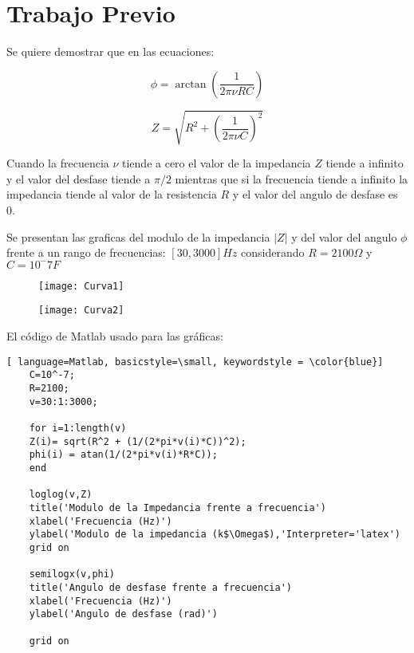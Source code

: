 \documentclass[article, 11pt]{report}
\begin{document}
	\section{Trabajo Previo}
	
	
	 Se quiere demostrar que en las ecuaciones:


$$ \phi = \arctan(\dfrac{1}{2\pi \nu RC })$$ 
	 

$$ Z = \sqrt{R^2 +  (\dfrac{1}{2 \pi \nu C})^2}	$$

Cuando la frecuencia $\nu$ tiende a cero el valor de la impedancia $Z$ tiende a infinito y el valor del desfase tiende a $\pi/2$ mientras que si la frecuencia tiende a infinito la impedancia tiende al valor de la resistencia $R$ y el valor del angulo de desfase es 0.

Se presentan las graficas del modulo de la impedancia $|Z|$ y del valor del angulo $\phi$ frente a un rango de frecuencias: $[30,3000]Hz$ considerando $R=2100\Omega$ y $C= 10^-7 F$	



	


\begin{figure}[H]
	\centering
	\begin{minipage}{.5\textwidth}
		\centering
		\texttt{[image: Curva1]}
	\end{minipage}%
	\begin{minipage}{.5\textwidth}
		\centering
		\texttt{[image: Curva2]}

	\end{minipage}
\end{figure}

El código de Matlab usado para las gráficas:

\lstset{language= Matlab, breaklines=true, basicstyle=\footnotesize}
\begin{lstlisting}[ language=Matlab, basicstyle=\small, keywordstyle = \color{blue}]
	C=10^-7;
	R=2100;
	v=30:1:3000;
	
	for i=1:length(v)
	Z(i)= sqrt(R^2 + (1/(2*pi*v(i)*C))^2);
	phi(i) = atan(1/(2*pi*v(i)*R*C));
	end
	
	loglog(v,Z)
	title('Modulo de la Impedancia frente a frecuencia')
	xlabel('Frecuencia (Hz)')
	ylabel('Modulo de la impedancia (k$\Omega$),'Interpreter='latex')
	grid on
	
	semilogx(v,phi)
	title('Angulo de desfase frente a frecuencia')
	xlabel('Frecuencia (Hz)')
	ylabel('Angulo de desfase (rad)')
	
	grid on
\end{lstlisting}
\end{document}
